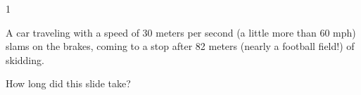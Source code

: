 
\AddToShipoutPicture*{\BackgroundPic}

\addtocounter {ProbNum} {1}

 
{\bf \Large{}} A car traveling with a speed of 30 meters per second (a little more than 60 mph) slams on the brakes, coming to a stop after 82 meters (nearly a football field!) of skidding.   \bigskip

How long did this slide take?\paragraph{}
\noindent
\vfill




\newpage
